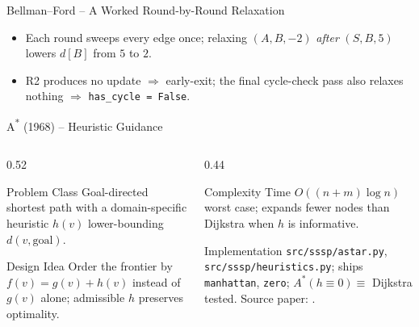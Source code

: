 \documentclass[aspectratio=169]{beamer}
\begin{document}
\begin{frame}{Bellman--Ford -- A Worked Round-by-Round Relaxation}
\begin{center}
{
  }
  \end{center}

  \begin{itemize}
    \item Each round sweeps every edge once; relaxing $(A,B,-2)$ \emph{after} $(S,B,5)$ lowers $d[B]$ from $5$ to $2$.
    \item R2 produces no update $\Rightarrow$ early-exit; the final cycle-check pass also relaxes nothing $\Rightarrow$ \texttt{has\_cycle = False}.
  \end{itemize}
\end{frame}

\begin{frame}{A\textsuperscript{*} (1968) -- Heuristic Guidance}
  \begin{columns}[T]
    \begin{column}{0.52\textwidth}
      \begin{block}{Problem Class}
        Goal-directed shortest path with a domain-specific heuristic $h(v)$ lower-bounding $d(v, \mathrm{goal})$.
      \end{block}
      \begin{block}{Design Idea}
        Order the frontier by $f(v) = g(v) + h(v)$ instead of $g(v)$ alone; admissible $h$ preserves optimality.
      \end{block}
    \end{column}
    \begin{column}{0.44\textwidth}
      \begin{exampleblock}{Complexity}
        Time $O((n+m) \log n)$ worst case; expands fewer nodes than Dijkstra when $h$ is informative.
      \end{exampleblock}
      \begin{alertblock}{Implementation}
        \texttt{src/sssp/astar.py}, \texttt{src/sssp/heuristics.py}; ships \texttt{manhattan}, \texttt{zero}; \alert{$A^*(h\equiv 0) \equiv$ Dijkstra} tested.
        Source paper: \cite{hart1968astar}.
      \end{alertblock}
    \end{column}
  \end{columns}
\end{frame}
\end{document}
